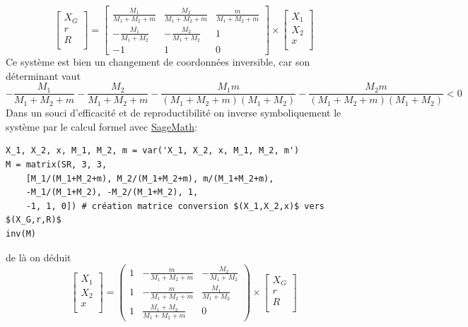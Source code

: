 \documentclass[svgnames,dvipsnames,a4paper,10pt,french]{report}
\begin{document}
\begin{equation}
\begin{bmatrix}
X_G \\[3pt]
r \\[3pt]
R \\[3pt]
\end{bmatrix}
= 
\begin{bmatrix}
\frac{M_{1}}{M_{1} + M_{2} + m} & \frac{M_{2}}{M_{1} + M_{2} + m} & \frac{m}{M_{1} + M_{2} + m} \\
-\frac{M_{1}}{M_{1} + M_{2}} & -\frac{M_{2}}{M_{1} + M_{2}} & 1 \\
-1 & 1 & 0
\end{bmatrix} \times 
\begin{bmatrix}
X_1 \\[3pt]
X_2 \\[3pt]
x \\[3pt]
\end{bmatrix}
\end{equation}
Ce système est bien un changement de coordonnées inversible, car son déterminant vaut
\begin{equation}
    \newcommand{\Bold}[1]{\mathbf{#1}}-\frac{M_{1}}{M_{1} + M_{2} + m} - \frac{M_{2}}{M_{1} + M_{2} + m} - \frac{M_{1} m}{{\left(M_{1} + M_{2} + m\right)} {\left(M_{1} + M_{2}\right)}} - \frac{M_{2} m}{{\left(M_{1} + M_{2} + m\right)} {\left(M_{1} + M_{2}\right)}} <0
\end{equation}
Dans un souci d'efficacité et de reproductibilité on inverse symboliquement le système par le calcul formel avec \href{www.sagemath.org/}{SageMath}:


\begin{verbatim}
X_1, X_2, x, M_1, M_2, m = var('X_1, X_2, x, M_1, M_2, m')
M = matrix(SR, 3, 3,
    [M_1/(M_1+M_2+m), M_2/(M_1+M_2+m), m/(M_1+M_2+m),
    -M_1/(M_1+M_2), -M_2/(M_1+M_2), 1,
    -1, 1, 0]) # création matrice conversion $(X_1,X_2,x)$ vers $(X_G,r,R)$
inv(M) 
\end{verbatim}

de là on déduit
\begin{equation}
\begin{bmatrix}
X_1 \\[3pt]
X_2 \\[3pt]
x \\[3pt]
\end{bmatrix}
=
\left(\begin{array}{rrr}
1 & -\frac{m}{M_{1} + M_{2} + m} & -\frac{M_{2}}{M_{1} + M_{2}} \\
1 & -\frac{m}{M_{1} + M_{2} + m} & \frac{M_{1}}{M_{1} + M_{2}} \\
1 & \frac{M_{1} + M_{2}}{M_{1} + M_{2} + m} & 0
\end{array}\right)
\times
\begin{bmatrix}
X_G \\[3pt]
r \\[3pt]
R \\[3pt]
\end{bmatrix}
\end{equation}
\end{document}
